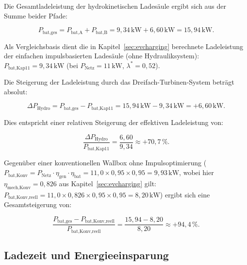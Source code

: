 ﻿\documentclass[a4paper,12pt]{article}
\begin{document}
Die Gesamtladeleistung der hydrokinetischen Ladesäule ergibt sich
aus der Summe beider Pfade:

\begin{equation}
  P_\text{bat,ges} = P_\text{bat,A} + P_\text{bat,B}
                   = 9{,}34\,\text{kW} + 6{,}60\,\text{kW}
                   = 15{,}94\,\text{kW}.
  \label{eq:P_bat_ges}
\end{equation}

Als Vergleichsbasis dient die in Kapitel~\ref{sec:evcharging} berechnete
Ladeleistung der einfachen impulsbasierten Ladesäule (ohne Hydrauliksystem):
$P_\text{bat,Kap11} = 9{,}34\,\text{kW}$ (bei $P_\text{Netz} = 11\,\text{kW}$,
$\lambda^* = 0{,}52$).

Die Steigerung der Ladeleistung durch das Dreifach-Turbinen-System beträgt
absolut:

\begin{equation}
  \Delta P_\text{Hydro}
    = P_\text{bat,ges} - P_\text{bat,Kap11}
    = 15{,}94\,\text{kW} - 9{,}34\,\text{kW}
    = +6{,}60\,\text{kW}.
  \label{eq:delta_P_hydro}
\end{equation}

Dies entspricht einer relativen Steigerung der effektiven Ladeleistung von:

\begin{equation}
  \frac{\Delta P_\text{Hydro}}{P_\text{bat,Kap11}}
    = \frac{6{,}60}{9{,}34} \approx +70{,}7\,\%.
  \label{eq:rel_steigerung_P}
\end{equation}

Gegenüber einer konventionellen Wallbox ohne Impulsoptimierung
($P_\text{bat,Konv} = P_\text{Netz} \cdot \eta_\text{gen} \cdot \eta_\text{bat}
= 11{,}0 \times 0{,}95 \times 0{,}95 = 9{,}93\,\text{kW}$, wobei hier
$\eta_\text{mech,Konv} = 0{,}826$ aus Kapitel~\ref{sec:evcharging} gilt:
$P_\text{bat,Konv,reell} = 11{,}0 \times 0{,}826 \times 0{,}95 \times 0{,}95
= 8{,}20\,\text{kW}$) ergibt sich eine Gesamtsteigerung von:

\begin{equation}
  \frac{P_\text{bat,ges} - P_\text{bat,Konv,reell}}{P_\text{bat,Konv,reell}}
    = \frac{15{,}94 - 8{,}20}{8{,}20} \approx +94{,}4\,\%.
  \label{eq:rel_steigerung_P_konv}
\end{equation}

\subsection{Ladezeit und Energieeinsparung}
\end{document}
